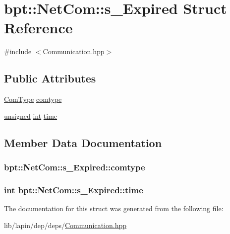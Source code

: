 \hypertarget{structbpt_1_1_net_com_1_1s___expired}{\section{bpt\-:\-:Net\-Com\-:\-:s\-\_\-\-Expired Struct Reference}
\label{structbpt_1_1_net_com_1_1s___expired}
}


{\ttfamily \#include $<$Communication.\-hpp$>$}

\subsection*{Public Attributes}
\begin{DoxyCompactItemize}
\item 
\hyperlink{namespacebpt_1_1_net_com_a73b47b2b099bf7d28997dc72c921212c}{Com\-Type} \hyperlink{structbpt_1_1_net_com_1_1s___expired_a0d8e49128ce0049188ce08956736c610}{comtype}
\item 
\hyperlink{curses_8priv_8h_aca40206900cfc164654362fa8d4ad1e6}{unsigned} \hyperlink{term__entry_8h_ad65b480f8c8270356b45a9890f6499ae}{int} \hyperlink{structbpt_1_1_net_com_1_1s___expired_a4b3b848a731a7cb633936e6ac2455250}{time}
\end{DoxyCompactItemize}


\subsection{Member Data Documentation}
\hypertarget{structbpt_1_1_net_com_1_1s___expired_a0d8e49128ce0049188ce08956736c610}{
\subsubsection[{comtype}]{ bpt\-::\-Net\-Com\-::s\-\_\-\-Expired\-::comtype}}\label{structbpt_1_1_net_com_1_1s___expired_a0d8e49128ce0049188ce08956736c610}
\hypertarget{structbpt_1_1_net_com_1_1s___expired_a4b3b848a731a7cb633936e6ac2455250}{
\subsubsection[{time}]{ {\bf int} bpt\-::\-Net\-Com\-::s\-\_\-\-Expired\-::time}}\label{structbpt_1_1_net_com_1_1s___expired_a4b3b848a731a7cb633936e6ac2455250}


The documentation for this struct was generated from the following file\-:\begin{DoxyCompactItemize}
\item 
lib/lapin/dep/deps/\hyperlink{_communication_8hpp}{Communication.\-hpp}\end{DoxyCompactItemize}
